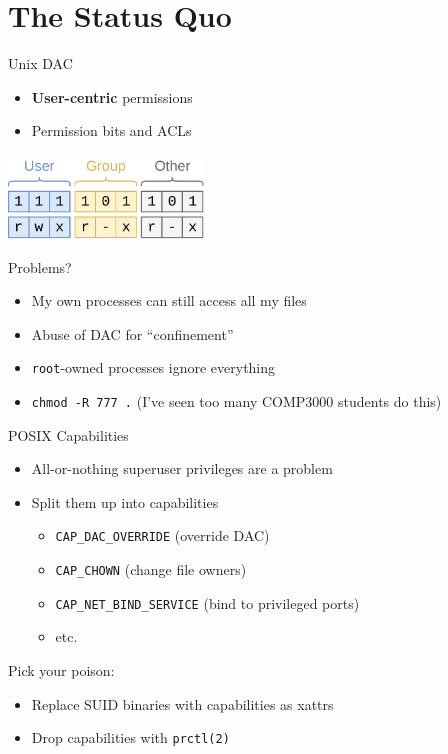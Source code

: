 \documentclass[12pt, dvipsnames, aspectratio=169]{beamer}
\begin{document}
\section{The Status Quo}

\begin{frame}[c]{Unix DAC}
\begin{itemize}
    \item \textbf{User-centric} permissions
    \item Permission bits and ACLs
\end{itemize}
\begin{center}
    \color{black}
    \includegraphics[height=6em]{figs/unix-dac.pdf}
\end{center}
Problems?
\begin{itemize}
    \item My own processes can still access all my files
    \item Abuse of DAC for \enquote{confinement}
    \item \texttt{root}-owned processes ignore everything
    \item \texttt{chmod -R 777 .} (I've seen too many COMP3000 students do this)
\end{itemize}
\end{frame}

\begin{frame}[c]{POSIX Capabilities}
\begin{itemize}
    \item All-or-nothing superuser privileges are a problem
    \item Split them up into capabilities
    \begin{itemize}
        \item \texttt{CAP\_DAC\_OVERRIDE} (override DAC)
        \item \texttt{CAP\_CHOWN} (change file owners)
        \item \texttt{CAP\_NET\_BIND\_SERVICE} (bind to privileged ports)
        \item etc.
    \end{itemize}
\end{itemize}
\vfill
Pick your poison:
\begin{itemize}
    \item Replace SUID binaries with capabilities as xattrs
    \item Drop capabilities with \texttt{prctl(2)}
\end{itemize}
\end{frame}
\end{document}
